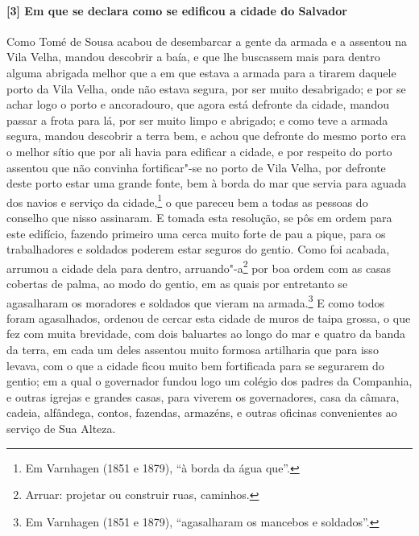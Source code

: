 \paragraph{[3] Em que se declara como se edificou a cidade do Salvador} \quad
Como Tomé de Sousa acabou de desembarcar a gente da armada e a assentou na Vila Velha,
mandou descobrir a baía, e que lhe buscassem mais para dentro alguma abrigada melhor que a
em que estava a armada para a tirarem daquele porto da Vila Velha, onde não estava segura,
por ser muito desabrigado; e por se achar logo o porto e ancoradouro, que agora está
defronte da cidade, mandou passar a frota para lá, por ser muito limpo e abrigado; e como
teve a armada segura, mandou descobrir a terra bem, e achou que defronte do mesmo porto
era o melhor sítio que por ali havia para edificar a cidade, e por respeito do porto
assentou que não convinha fortificar"-se no porto de Vila Velha, por defronte deste porto
estar uma grande fonte, bem à borda do mar que servia para aguada dos navios e serviço da
cidade,\footnote{ Em Varnhagen (1851 e 1879), ``à borda da água que''.} o que pareceu bem
a todas as pessoas do conselho que nisso assinaram. E tomada esta resolução, se pôs em
ordem para este edifício, fazendo primeiro uma cerca muito forte de pau a pique, para os
trabalhadores e soldados poderem estar seguros do gentio. Como foi acabada, arrumou a
cidade dela para dentro, arruando"-a\footnote{ Arruar: projetar ou construir ruas,
caminhos.} por boa ordem com as casas cobertas de palma, ao modo do gentio, em 
as quais por entretanto se agasalharam os moradores e soldados que vieram na
armada.\footnote{ Em Varnhagen (1851 e 1879), ``agasalharam os mancebos e soldados''.} E
como todos foram agasalhados, ordenou de cercar esta cidade de muros de taipa grossa, o
que fez com muita brevidade, com dois baluartes ao longo do mar e quatro da banda da
terra, em cada um deles assentou muito formosa artilharia que para isso levava, com o que
a cidade ficou muito bem fortificada para se segurarem do gentio; em a qual o governador
fundou logo um colégio dos padres da Companhia, e outras igrejas e grandes casas, para
viverem os governadores, casa da câmara, cadeia, alfândega, contos, fazendas, armazéns, e
outras oficinas convenientes ao serviço de Sua Alteza.

